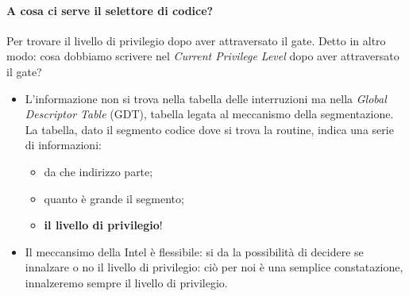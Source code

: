 \documentclass[11pt]{report}
\theoremstyle{definition}
\begin{document}
\paragraph{A cosa ci serve il selettore di codice?} Per trovare il livello di privilegio dopo aver attraversato il gate. Detto in altro modo: cosa dobbiamo scrivere nel \emph{Current Privilege Level} dopo aver attraversato il gate?
	\begin{itemize}
		\item  L'informazione non si trova nella tabella delle interruzioni ma nella \emph{Global Descriptor Table} (GDT), tabella legata al meccanismo della segmentazione. La tabella, dato il segmento codice dove si trova la routine, indica una serie di informazioni:
		\begin{itemize}
			\item da che indirizzo parte;
			\item quanto è grande il segmento;
			\item \textbf{il livello di privilegio}!
		\end{itemize} 
		\item Il meccansimo della Intel è flessibile: si da la possibilità di decidere se innalzare o no il livello di privilegio: ciò per noi è una semplice constatazione, innalzeremo sempre il livello di privilegio.
	\end{itemize} 
	\clearpage
\end{document}
